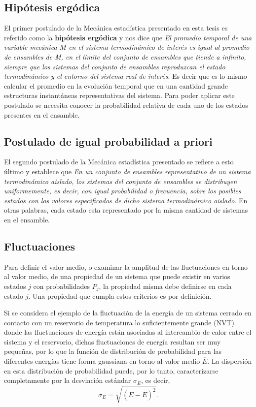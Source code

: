 \subsection{Hipótesis ergódica}

El primer postulado de la Mecánica estadística presentado en esta tesis es 
referido como la \textbf{hipótesis ergódica} y nos dice que \textit{El promedio 
temporal de una variable mecánica $M$ en el sistema termodinámico de interés es 
igual al promedio de ensambles de M, en el límite del conjunto de ensambles que 
tiende a infinito, siempre que los sistemas del conjunto de ensambles reproduzcan 
el estado termodinámico y el entorno del sistema real de interés}. Es decir que
es lo mismo calcular el promedio en la evolución temporal que en una cantidad 
grande estructuras instantáneas representativas del sistema. Para poder aplicar
este postulado se necesita conocer la probabilidad relativa de cada uno de los 
estados presentes en el ensamble.

\subsection{Postulado de igual probabilidad a priori}

El segundo postulado de la Mecánica estadística presentado se refiere a esto
último y establece que \textit{En un conjunto de ensambles representativo de un 
sistema termodinámico aislado, los sistemas del conjunto de ensambles se distribuyen 
uniformemente, es decir, con igual probabilidad o frecuencia, sobre los posibles 
estados con los valores especificados de dicho sistema termodinámico aislado}.
En otras palabras, cada estado esta representado por la misma cantidad de sistemas
en el ensamble.

\subsection{Fluctuaciones}

Para definir el valor medio, o examinar la amplitud de las fluctuaciones en torno 
al valor medio, de una propiedad de un sistema que puede existir en varios estados
$j$ con probabilidades $P_j$, la propiedad misma debe definirse en cada estado 
$j$. Una propiedad que cumpla estos criterios es  por definición.

Si se considera el ejemplo de la fluctuación de la energía de un sistema cerrado 
en  contacto con un reservorio de temperatura lo suficientemente grande (NVT) 
donde las fluctuaciones de energía están asociadas al intercambio de calor entre 
el sistema y el reservorio, dichas fluctuaciones de energía resultan ser muy 
pequeñas, por lo que la función de distribución de probabilidad para las 
diferentes energías tiene forma gaussiana en torno al valor medio $\overline{E}$. 
La dispersión en esta distribución de probabilidad puede, por lo tanto,
caracterizarse completamente por la desviación estándar $\sigma_E$, es decir, 
$$
\sigma_E = \sqrt{\overline{(E - \overline{E})^2}}.
$$

